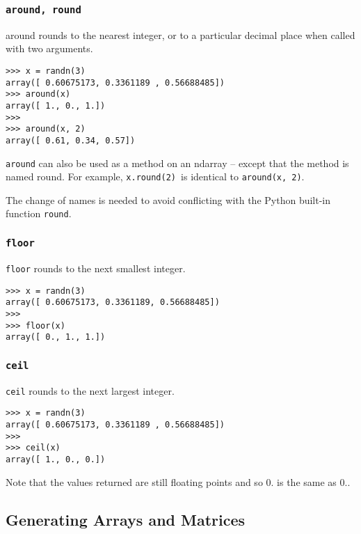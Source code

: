 \documentclass[KSmain.tex]{subfiles}
\begin{document}
\subsubsection*{\texttt{around, round}}
around rounds to the nearest integer, or to a particular decimal place when called with two arguments.
\begin{framed}
\begin{verbatim}
>>> x = randn(3)
array([ 0.60675173, 0.3361189 , 0.56688485])
>>> around(x)
array([ 1., 0., 1.])
>>>
>>> around(x, 2)
array([ 0.61, 0.34, 0.57])
\end{verbatim}
\end{framed}
\noindent \texttt{around} can also be used as a method on an ndarray – except that the method is named round. For example,
\texttt{x.round(2) }is identical to \texttt{around(x, 2)}. 

The change of names is needed to avoid conflicting with the Python built-in function \texttt{round}.
\newpage

\subsubsection*{\texttt{floor}}
\texttt{floor} rounds to the next smallest integer.
\begin{framed}
\begin{verbatim}
>>> x = randn(3)
array([ 0.60675173, 0.3361189, 0.56688485])
>>>
>>> floor(x) 
array([ 0., 1., 1.])
\end{verbatim}
\end{framed}
\subsubsection*{\texttt{ceil}}
\texttt{ceil} rounds to the next largest integer.
\begin{framed}
\begin{verbatim}
>>> x = randn(3)
array([ 0.60675173, 0.3361189 , 0.56688485])
>>>
>>> ceil(x) 
array([ 1., 0., 0.])
\end{verbatim}
\end{framed}
Note that the values returned are still floating points and so 0.
is the same as 0..



\subsection{Generating Arrays and Matrices}
\end{document}
